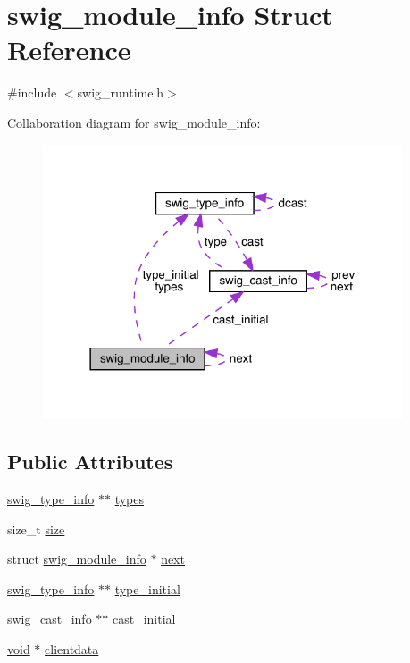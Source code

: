 \hypertarget{structswig__module__info}{}\section{swig\+\_\+module\+\_\+info Struct Reference}
\label{structswig__module__info}


{\ttfamily \#include $<$swig\+\_\+runtime.\+h$>$}



Collaboration diagram for swig\+\_\+module\+\_\+info\+:\nopagebreak
\begin{figure}[H]
\begin{center}
\leavevmode
\includegraphics[width=302pt]{structswig__module__info__coll__graph}
\end{center}
\end{figure}
\subsection*{Public Attributes}
\begin{DoxyCompactItemize}
\item 
\mbox{\hyperlink{structswig__type__info}{swig\+\_\+type\+\_\+info}} $\ast$$\ast$ \mbox{\hyperlink{structswig__module__info_abda310ff2462f8a1ebfc8dc7552206f2}{types}}
\item 
size\+\_\+t \mbox{\hyperlink{structswig__module__info_aaf8907cf8509ee0464af8c9dfd909042}{size}}
\item 
struct \mbox{\hyperlink{structswig__module__info}{swig\+\_\+module\+\_\+info}} $\ast$ \mbox{\hyperlink{structswig__module__info_ac177d150b85ab77122089acf1f06d9c6}{next}}
\item 
\mbox{\hyperlink{structswig__type__info}{swig\+\_\+type\+\_\+info}} $\ast$$\ast$ \mbox{\hyperlink{structswig__module__info_af5e826d0f0c1698f7404543a7d5b258a}{type\+\_\+initial}}
\item 
\mbox{\hyperlink{structswig__cast__info}{swig\+\_\+cast\+\_\+info}} $\ast$$\ast$ \mbox{\hyperlink{structswig__module__info_a281dac542d1af6af141b8366ecc4de92}{cast\+\_\+initial}}
\item 
\mbox{\hyperlink{_thread_8h_af1e856da2e658414cb2456cb6f7ebc66}{void}} $\ast$ \mbox{\hyperlink{structswig__module__info_a9fb6e461fcaf14c209049adfae4e9754}{clientdata}}
\end{DoxyCompactItemize}


